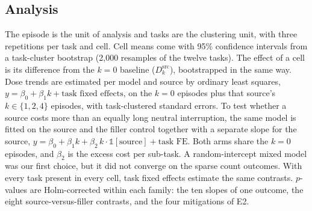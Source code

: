\subsection{Analysis}
\label{sec:analysis}

The episode is the unit of analysis and tasks are the clustering unit, with three repetitions per
task and cell. Cell means come with 95\% confidence intervals from a task-cluster bootstrap (2{,}000
resamples of the twelve tasks). The effect of a cell is its difference from the $k=0$ baseline
($D_k^{\mathrm{src}}$), bootstrapped in the same way. Dose trends are estimated per model and source
by ordinary least squares, $y = \beta_0 + \beta_1 k + \text{task fixed effects}$, on the $k=0$
episodes plus that source's $k\in\{1,2,4\}$ episodes, with task-clustered standard errors. To test
whether a source costs more than an equally long neutral interruption, the same model is fitted on
the source and the filler control together with a separate slope for the source,
$y = \beta_0 + \beta_1 k + \beta_2\, k\cdot\mathbb{1}[\text{source}] + \text{task FE}$. Both arms
share the $k=0$ episodes, and $\beta_2$ is the excess cost per sub-task. A random-intercept mixed
model was our first choice, but it did not converge on the sparse count outcomes. With every task
present in every cell, task fixed effects estimate the same contrasts. $p$-values are
Holm-corrected within each family: the ten slopes of one outcome, the eight source-versus-filler
contrasts, and the four mitigations of E2.
